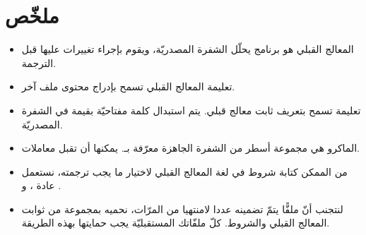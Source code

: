 \section*{ملخّص}
\begin{itemize}
  \item المعالج القبلي هو برنامج يحلّل الشفرة المصدريّة، ويقوم بإجراء تغييرات عليها قبل الترجمة.
  \item تعليمة المعالج القبلي
تسمح بإدراج محتوى ملف آخر.
  \item تعليمة
تسمح بتعريف ثابت معالج قبلي. يتم استبدال كلمة مفتاحيّة بقيمة في الشفرة المصدريّة.
  \item الماكرو هي مجموعة أسطر من الشفرة الجاهزة معرّفة بـ.
يمكنها أن تقبل معاملات.
  \item من الممكن كتابة شروط في لغة المعالج القبلي لاختيار ما يجب ترجمته، نستعمل عادة
،
و
.
  \item لنتجنب أنّ ملفًّا
يتمّ تضمينه عددا لامنتهيا من المرّات، نحميه بمجموعة من ثوابت المعالج القبلي والشروط. كلّ ملفّاتك
المستقبليّة يجب حمايتها بهذه الطريقة.
\end{itemize}
